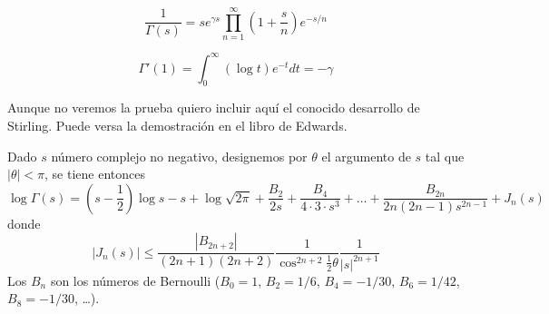 \documentclass[TAN.tex]{subfiles}
\begin{document}
\begin{prop}
\[ \frac{1}{Γ(s)} = s e^{γs} \prod_{n=1}^{∞} \left(1 + \frac{s}{n}\right) e^{-s/n} \]
\end{prop}
\begin{prop}
\[ Γ'(1) = \int_0^{∞} (\log t) e^{-t} dt = -γ \]
\end{prop}
Aunque no veremos la prueba quiero incluir aquí el conocido desarrollo de Stirling. Puede versa la demostración en el libro de Edwards.
\begin{prop}
Dado $s$ número complejo no negativo, designemos por $θ$ el argumento de $s$ tal que $|θ| < π$, se tiene entonces
\[ \log Γ(s) = \left(s - \frac{1}{2}\right) \log s - s + \log \sqrt{2π} + \frac{B_2}{2s} + \frac{B_4}{4\cdot 3 \cdot s^3} + \dots + \frac{B_{2n}}{2n(2n-1)s^{2n-1}} + J_n(s) \]
donde
\[ |J_n(s)| ≤ \frac{|B_{2n+2}|}{(2n+1)(2n+2)} \frac{1}{\cos^{2n+2}\frac{1}{2}θ} \frac{1}{|s|^{2n+1}} \]
Los $B_n$ son los números de Bernoulli ($B_0=1$, $B_2 = 1/6$, $B_4=-1/30$, $B_6 = 1/42$, $B_8 = -1/30$, \dots).
\end{prop}
\end{document}
